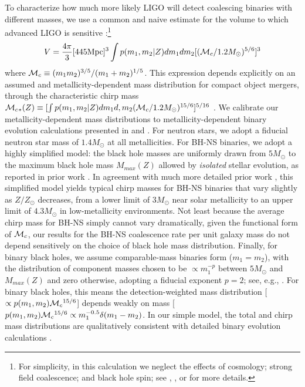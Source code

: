 \documentclass[a4paper,fleqn,usenatbib]{mnras}
\newcommand\mc{{\cal M}_c{}}
\newcommand\unit[1]{\text{#1}}
\begin{document}
To characterize how much more likely LIGO will detect coalescing binaries with different masses, we use a common and
naive estimate for the volume to which advanced LIGO is sensitive \citep[see,e.g.,][]{PSellipticals}:\footnote{For
  simplicity, in this calculation we neglect the effects of cosmology; strong field coalescence; and black hole spin;
  see \cite{popsyn-LowMetallicityImpact2c-StarTrackRevised-2014}, \cite{AstroPaper}, or \cite{RatesPaper} for more details.}
\begin{eqnarray}
V = \frac{4\pi}{3} [445 \unit{Mpc}]^3 \int p(m_1,m_2|Z) dm_1 dm_2 [ (\mc/1.2 M_\odot)^{5/6}]^3
\end{eqnarray}
where $\mc\equiv (m_1 m_2)^{3/5}/(m_1+m_2)^{1/5}$.   
This expression depends explicitly on an assumed and metallicity-dependent mass distribution for compact object
mergers, through the characteristic chirp mass $\mc_{*}(Z)\equiv [\int p(m_1,m_2|Z) dm_1 d,m_2 (\mc/1.2
  M_\odot)^{15/6}]^{5/16}$ .  We calibrate our metallicity-dependent mass distributions to metallicity-dependent binary
evolution calculations presented in \cite{popsyn-LowMetallicityImpact2-StarTrackRevised-2012} and
\cite{popsyn-LowMetallicityImpact2c-StarTrackRevised-2014}.  For neutron
stars, we adopt a fiducial neutron star mass of $1.4 M_\odot$ at all metallicities.  For BH-NS binaries, we adopt a
highly simplified model: the black hole masses are uniformly  drawn from $5 M_\odot$ to the maximum 
black hole mass $M_{max}(Z)$ allowed by
\emph{isolated} stellar evolution, as reported in prior work \citep[see,e.g.][and references
  therein]{gwastro-EventPopsynPaper-2016}.  In agreement with much more detailed prior work \cite{popsyn-LowMetallicityImpact2c-StarTrackRevised-2014}, this simplified model yields typical chirp masses for BH-NS binaries that
vary slightly as $Z/Z_\odot$ decreases, from a lower limit of $3 M_\odot$ near solar metallicity to an upper limit of
$4.3 M_\odot$ in low-metallicity environments.  Not least because the average chirp mass for BH-NS simply cannot vary
dramatically, given the functional form of $\mc$, our results for the BH-NS coalescence rate per unit galaxy mass do not depend sensitively on the choice of black hole mass
distribution.  Finally, for binary black holes, we assume  comparable-mass binaries
form ($m_1=m_2$), with the distribution of component masses chosen to be $\propto m_1^{-p}$ 
 between $5 M_\odot$ and $M_{max}(Z)$ and zero otherwise, adopting a fiducial exponent $p=2$; see, e.g.,
\cite{popsyn-LowMetallicityImpact2b-StarTrackRevised-2013}.    For binary black holes, this means  the
detection-weighted mass distribution [$\propto p(m_1,m_2)
\mc^{15/6}$] depends weakly on mass [$ p(m_1,m_2)
\mc^{15/6} \propto m_1^{-0.5} \delta(m_1-m_2)$.  In our simple model, the total  and chirp mass
distributions   are qualitatively consistent with detailed  binary evolution calculations \citep{popsyn-LowMetallicityImpact2b-StarTrackRevised-2013}. 
\end{document}
